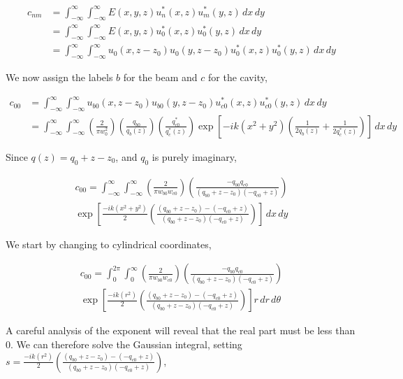 \newcommand{\intinfxy}[1]{\int^{\infty}_{- \infty} \int^{\infty}_{- \infty} #1 \,dx \,dy}
\newcommand{\intinfrt}[1]{\int^{2 \pi}_{0} \int^{\infty}_{0} #1 r \,dr \,d\theta}


\begin{align}
    c_{nm} &= \intinfxy{
    E(x,y,z) u_n^*(x,z)u_m^*(y,z)} \nonumber
\\  &= \intinfxy{
    E(x,y,z) u_0^*(x,z)u_0^*(y,z)} \nonumber
\\  &= \intinfxy{
    u_0(x,z-z_0)u_0(y,z-z_0) u_0^*(x,z)u_0^*(y,z)}
\end{align}

We now assign the labels $b$ for the beam and $c$ for the cavity,

\begin{align}
    c_{00} &= \intinfxy{
    u_{b0}(x,z-z_0)u_{b0}(y,z-z_0) u_{c0}^*(x,z)u_{c0}^*(y,z)} \nonumber
\\  &= \intinfxy{ \left( \frac{2}{\pi w^2_0} \right) \left( \frac{q_{b0}}{q_{b}(z)} \right)
    \left( \frac{q^*_{c0}}{q^*_{c}(z)} \right) \exp \left[-ik \left( x^2 + y^2  \right)
    \left( \frac{1}{2q_b(z)} + \frac{1}{2q^*_c(z)} \right) \right]}
\end{align}

Since $q(z) = q_0 + z - z_0$, and $q_0$ is purely imaginary,


\begin{multline}
    c_{00} = \intinfxy{ \left( \frac{2}{\pi w_{b0} w_{c0}} \right)
    \left( \frac{- q_{b0} q_{c0}}{(q_{b0}+z-z_0)(-q_{c0}+z)} \right) \\
    \exp \left[
    \frac{-ik \left( x^2 + y^2  \right)}{2} \left( \frac{(q_{b0}+z-z_0)-(-q_{c0}+z)}{(q_{b0}+z-z_0)(-q_{c0}+z)} \right)
    \right]}
\end{multline}

We start by changing to cylindrical coordinates,

\begin{multline}
    c_{00} = \intinfrt{ \left( \frac{2}{\pi w_{b0} w_{c0}} \right)
    \left( \frac{- q_{b0} q_{c0}}{(q_{b0}+z-z_0)(-q_{c0}+z)} \right) \\
    \exp \left[
    \frac{-ik \left( r^2  \right)}{2} \left( \frac{(q_{b0}+z-z_0)-(-q_{c0}+z)}{(q_{b0}+z-z_0)(-q_{c0}+z)} \right)
    \right]}
\end{multline}

A careful analysis of the exponent will reveal that the real part must be less than $0$.
We can therefore solve the Gaussian integral, setting $s =
\frac{-ik \left( r^2  \right)}{2} \left( \frac{(q_{b0}+z-z_0)-(-q_{c0}+z)}{(q_{b0}+z-z_0)(-q_{c0}+z)} \right)
$,

